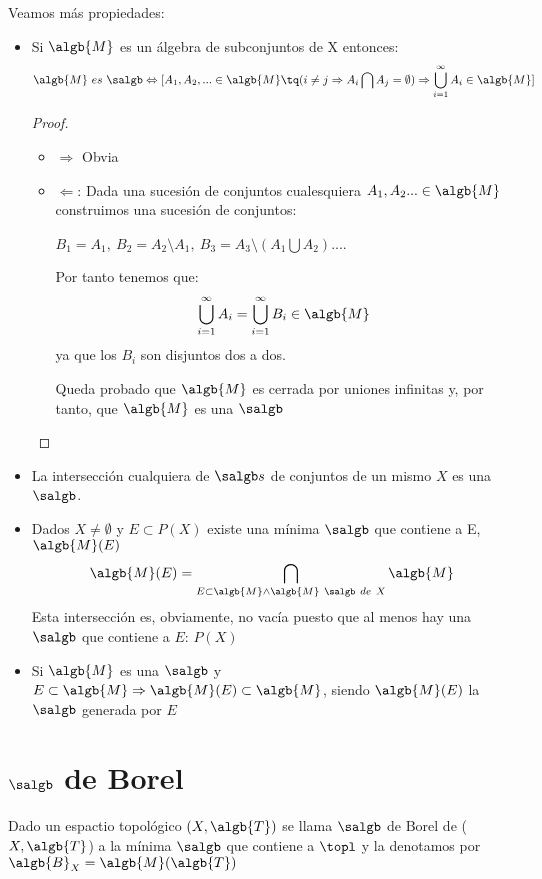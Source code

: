 \documentclass{apuntes}
\begin{document}
Veamos más propiedades:
\begin{itemize}
\item Si $\algb{M}$ es un álgebra de subconjuntos de X entonces:
\[\algb{M} \ es \ \salgb \Leftrightarrow [A_1,A_2,...\in \algb{M} \tq (i \neq j \Rightarrow A_i \bigcap A_j = \emptyset) \Rightarrow \bigcup_{i=1}^{\infty}A_i \in \algb{M}]\]

\begin{proof}
\begin{itemize}
\item $\Rightarrow$  Obvia
\item $\Leftarrow$:
Dada una sucesión de conjuntos cualesquiera $A_1,A_2... \in \algb{M}$ construimos una sucesión de conjuntos:

$B_1=A_1, \ B_2 = A_2\setminus A_1, \ B_3=A_3\setminus (A_1 \bigcup A_2)...$.

Por tanto tenemos que:
\[\bigcup_{i=1}^{\infty}A_i = \bigcup_{i=1}^{\infty} B_i \in \algb{M}\]
ya que los $B_i$ son disjuntos dos a dos.

Queda probado que $\algb{M}$ es cerrada por uniones infinitas y, por tanto, que $\algb{M}$ es una $\salgb$
\end{itemize}
\end{proof}

\item La intersección cualquiera de $\salgb s$ de conjuntos de un mismo $X$ es una $\salgb$.

\item Dados $X\neq \emptyset$ y $E \subset P(X)$ existe una mínima $\salgb$ que contiene a E, $\algb{M}(E)$
\[\algb{M}(E) = \bigcap_{E\subset \algb{M} \wedge \algb{M} \ \salgb \ de \ X}\algb{M} \]
Esta intersección es, obviamente, no vacía puesto que al menos hay una $\salgb$ que contiene a $E$: $P(X)$

\item Si $\algb{M}$ es una $\salgb$ y $E \subset \algb{M} \Rightarrow \algb{M}(E) \subset \algb{M}$, siendo $\algb{M}(E)$ la $\salgb$ generada por $E$
\end{itemize}

\section{$\salgb$ de Borel}
\begin{defn}
Dado un espactio topológico $(X,\algb{T})$ se llama $\salgb$ de Borel de ($X, \algb{T}$) a la mínima $\salgb$ que contiene a $\topl$ y la denotamos por $\algb{B}_X=\algb{M}(\algb{T})$

\end{defn}
\end{document}
